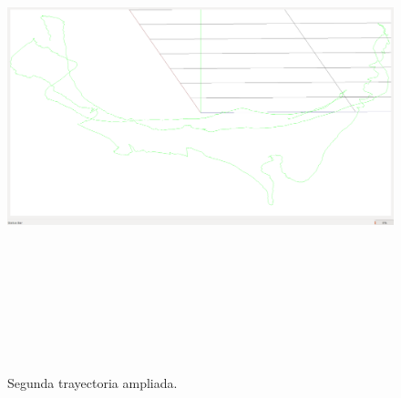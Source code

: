 \begin{figure}[H]
\begin{center}
\label{fig:secondTrayectory}\includegraphics[height=14.0cm,width=18.0cm]{img/cap6/segundaTrayectoria.png}
\hspace{0.5cm}

\end{center}
\caption{ Segunda trayectoria ampliada.}
\end{figure}

